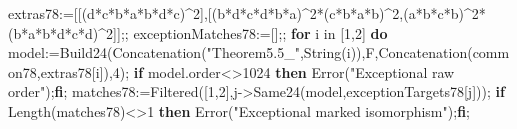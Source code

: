 \documentclass[
  10pt,
  letterpaper,
]{article}
\newenvironment{Shaded}{}{}
\newcommand{\BuiltInTok}[1]{\textcolor[rgb]{0.00,0.50,0.00}{#1}}
\newcommand{\ControlFlowTok}[1]{\textcolor[rgb]{0.00,0.44,0.13}{\textbf{#1}}}
\newcommand{\ExtensionTok}[1]{#1}
\newcommand{\FloatTok}[1]{\textcolor[rgb]{0.25,0.63,0.44}{#1}}
\newcommand{\NormalTok}[1]{#1}
\newcommand{\OperatorTok}[1]{\textcolor[rgb]{0.40,0.40,0.40}{#1}}
\newcommand{\StringTok}[1]{\textcolor[rgb]{0.25,0.44,0.63}{#1}}
\newcommand{\VariableTok}[1]{\textcolor[rgb]{0.10,0.09,0.49}{#1}}
\begin{document}
\begin{Shaded}
\begin{Highlighting}[]
\VariableTok{extras78}\OperatorTok{:=}\NormalTok{[[(}\VariableTok{d}\OperatorTok{*}\VariableTok{c}\OperatorTok{*}\VariableTok{b}\OperatorTok{*}\VariableTok{a}\OperatorTok{*}\VariableTok{b}\OperatorTok{*}\VariableTok{d}\OperatorTok{*}\VariableTok{c}\NormalTok{)}\OperatorTok{\^{}}\FloatTok{2}\NormalTok{]}\OperatorTok{,}\NormalTok{[(}\VariableTok{b}\OperatorTok{*}\VariableTok{d}\OperatorTok{*}\VariableTok{c}\OperatorTok{*}\VariableTok{d}\OperatorTok{*}\VariableTok{b}\OperatorTok{*}\VariableTok{a}\NormalTok{)}\OperatorTok{\^{}}\FloatTok{2}\OperatorTok{*}\NormalTok{(}\VariableTok{c}\OperatorTok{*}\VariableTok{b}\OperatorTok{*}\VariableTok{a}\OperatorTok{*}\VariableTok{b}\NormalTok{)}\OperatorTok{\^{}}\FloatTok{2}\OperatorTok{,}\NormalTok{(}\VariableTok{a}\OperatorTok{*}\VariableTok{b}\OperatorTok{*}\VariableTok{c}\OperatorTok{*}\VariableTok{b}\NormalTok{)}\OperatorTok{\^{}}\FloatTok{2}\OperatorTok{*}\NormalTok{(}\VariableTok{b}\OperatorTok{*}\VariableTok{a}\OperatorTok{*}\VariableTok{b}\OperatorTok{*}\VariableTok{d}\OperatorTok{*}\VariableTok{c}\OperatorTok{*}\VariableTok{d}\NormalTok{)}\OperatorTok{\^{}}\FloatTok{2}\NormalTok{]]}\OperatorTok{;;}
\VariableTok{exceptionMatches78}\OperatorTok{:=}\NormalTok{[]}\OperatorTok{;;}
\ControlFlowTok{for} \VariableTok{i} \ExtensionTok{in}\NormalTok{ [}\FloatTok{1}\OperatorTok{,}\FloatTok{2}\NormalTok{] }\ControlFlowTok{do}
 \VariableTok{model}\OperatorTok{:=}\VariableTok{Build24}\NormalTok{(}\BuiltInTok{Concatenation}\NormalTok{(}\StringTok{"Theorem5.5\_"}\OperatorTok{,}\BuiltInTok{String}\NormalTok{(}\VariableTok{i}\NormalTok{))}\OperatorTok{,}\VariableTok{F}\OperatorTok{,}\BuiltInTok{Concatenation}\NormalTok{(}\VariableTok{common78}\OperatorTok{,}\VariableTok{extras78}\NormalTok{[}\VariableTok{i}\NormalTok{])}\OperatorTok{,}\FloatTok{4}\NormalTok{)}\OperatorTok{;}
 \ControlFlowTok{if} \VariableTok{model}\NormalTok{.}\VariableTok{order}\OperatorTok{\textless{}\textgreater{}}\FloatTok{1024} \ControlFlowTok{then} \BuiltInTok{Error}\NormalTok{(}\StringTok{"Exceptional raw order"}\NormalTok{)}\OperatorTok{;}\ControlFlowTok{fi}\OperatorTok{;}
 \VariableTok{matches78}\OperatorTok{:=}\BuiltInTok{Filtered}\NormalTok{([}\FloatTok{1}\OperatorTok{,}\FloatTok{2}\NormalTok{]}\OperatorTok{,}\VariableTok{j}\OperatorTok{{-}\textgreater{}}\VariableTok{Same24}\NormalTok{(}\VariableTok{model}\OperatorTok{,}\VariableTok{exceptionTargets78}\NormalTok{[}\VariableTok{j}\NormalTok{]))}\OperatorTok{;}
 \ControlFlowTok{if} \BuiltInTok{Length}\NormalTok{(}\VariableTok{matches78}\NormalTok{)}\OperatorTok{\textless{}\textgreater{}}\FloatTok{1} \ControlFlowTok{then} \BuiltInTok{Error}\NormalTok{(}\StringTok{"Exceptional marked isomorphism"}\NormalTok{)}\OperatorTok{;}\ControlFlowTok{fi}\OperatorTok{;}

\end{Highlighting}
\end{Shaded}
\end{document}
